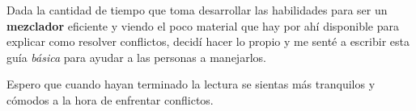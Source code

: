 Dada la cantidad de tiempo que toma desarrollar las habilidades para ser un {\bf mezclador} eficiente y viendo el poco material
que hay por ahí disponible para explicar como resolver conflictos, decidí hacer lo propio y me senté a escribir esta guía
{\it básica} para ayudar a las personas a manejarlos.

Espero que cuando hayan terminado la lectura se sientas más tranquilos y cómodos a la hora de enfrentar conflictos.


